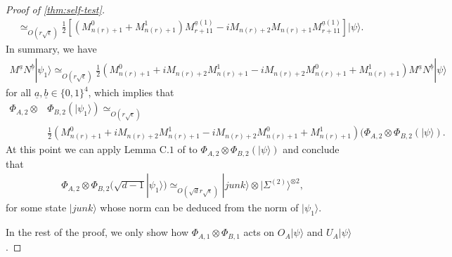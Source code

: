 \documentclass[11pt,letterpaper]{article}
\newcommand{\ket}[1]{|#1\rangle}
\newcommand{\x}{\otimes}
\newcommand{\1}{\mathbb{1}}
\newcommand{\EPR}[1]{\Sigma^{(#1)}}
\newcommand{\nr}{n(r)}
\newcommand{\ua}{\underline{a}}
\newcommand{\ub}{\underline{b}}
\newcommand{\se}{\sqrt{\epsilon}}
\newcommand{\sd}{\sqrt{d}}
\newcommand{\appd}[1]{\simeq_{#1}}
\theoremstyle{definition}
\begin{document}
\begin{proof}[Proof of \cref{thm:self-test}]
\begin{align*}
	&\appd{O(r\se)}\frac{1}{2} [(M_{\nr+1}^0+M_{\nr+1}^1) M_{r+11}^{\ua(1)} - iM_{\nr+2}M_{\nr+1}M_{r+11}^{\ua(1)} ] \ket{\psi}.
\end{align*}
In summary, we have 
\begin{align}
	M^{\ua} N^{\ub} \ket{\psi_1} \appd{O(r\se)} \frac{1}{2} (M_{\nr+1}^0 + iM_{\nr+2}M_{\nr+1}^1 - iM_{\nr+2}M_{\nr+1}^0 + M_{\nr+1}^1)M^{\ua}N^{\ub} \ket{\psi}
\end{align}
for all $\ua, \ub \in \{0,1\}^4$, which implies that 
\begin{align}
	\Phi_{A,2} \x& \Phi_{B,2}(\ket{\psi_1}) \appd{O(r\se)}\\
	 &\frac{1}{2} (M_{\nr+1}^0 + iM_{\nr+2}M_{\nr+1}^1 - iM_{\nr+2}M_{\nr+1}^0 + M_{\nr+1}^1)(\Phi_{A,2}\x\Phi_{B,2} (\ket{\psi}).
\end{align}
At this point we can apply Lemma C.$1$ of \cite{wu2016} to $\Phi_{A,2}\x\Phi_{B,2} (\ket{\psi})$ and conclude that 
\begin{align}
	\Phi_{A,2} \x \Phi_{B,2}(\sqrt{d-1} \ket{\psi_1}) \appd{O(\sd r \se)} \ket{junk} \x \ket{\EPR{2}}^{\x 2},
\end{align} 
for some state $\ket{junk}$ whose norm can be deduced from the norm of $\ket{\psi_1}$.

In the rest of the proof, we only show how $\Phi_{A,1} \x \Phi_{B,1}$ acts on $O_A\ket{\psi}$ and $U_A\ket{\psi}$.


\end{proof}
\end{document}
